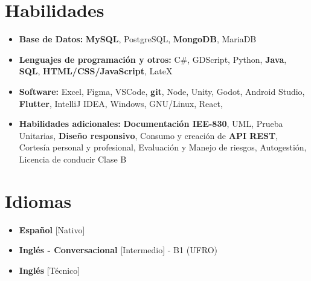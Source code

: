 \documentclass[11pt,a4paper,sans]{moderncv}
\newcommand{\sectionMargin}{-3mm}
\begin{document}
\section{Habilidades}{
    \begin{itemize}[label=\textbullet]
        \item {\textbf{Base de Datos:} 
            \textbf{MySQL}, 
            PostgreSQL, 
            \textbf{MongoDB}, 
            MariaDB
        }
        \item {\textbf{Lenguajes de programación y otros:} 
            C\#, 
            GDScript, 
            Python, 
            \textbf{Java},
            \textbf{SQL},
            \textbf{HTML/CSS/JavaScript},
            LateX
        }
        \item {\textbf{Software:}  
            Excel,  
            Figma, 
            VSCode, 
            \textbf{git},
            Node,
            Unity,
            Godot,
            Android Studio,
            \textbf{Flutter},
            IntelliJ IDEA,
            Windows,
            GNU/Linux,
            React,


        }
        \item {\textbf{Habilidades adicionales:} 
            \textbf{Documentación IEE-830},
            UML,
            Prueba Unitarias,
            \textbf{Diseño responsivo},
            Consumo y creación de \textbf{API REST},
            Cortesía personal y profesional, 
            Evaluación y Manejo de riesgos,  
            Autogestión, 
            Licencia de conducir Clase B
        }
    \end{itemize}
}

\vspace*{\sectionMargin}

\section{Idiomas}{
    \begin{multicols}{2}
        \begin{itemize}[label=\textbullet]
        \item \textbf{Español} [Nativo]
        \item \textbf{Inglés - Conversacional} [Intermedio] - B1 (UFRO)
        \item \textbf{Inglés} [Técnico]
        \end{itemize}
    \end{multicols}
}
\end{document}
